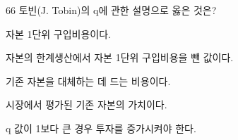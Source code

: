 \begin{question}{66}
토빈(J. Tobin)의 q에 관한 설명으로 옳은 것은?
\begin{choices}
  \item 자본 1단위 구입비용이다.
  \item 자본의 한계생산에서 자본 1단위 구입비용을 뺀 값이다.
  \item 기존 자본을 대체하는 데 드는 비용이다.
  \item 시장에서 평가된 기존 자본의 가치이다.
  \item q 값이 1보다 큰 경우 투자를 증가시켜야 한다.
\end{choices}
\end{question}
